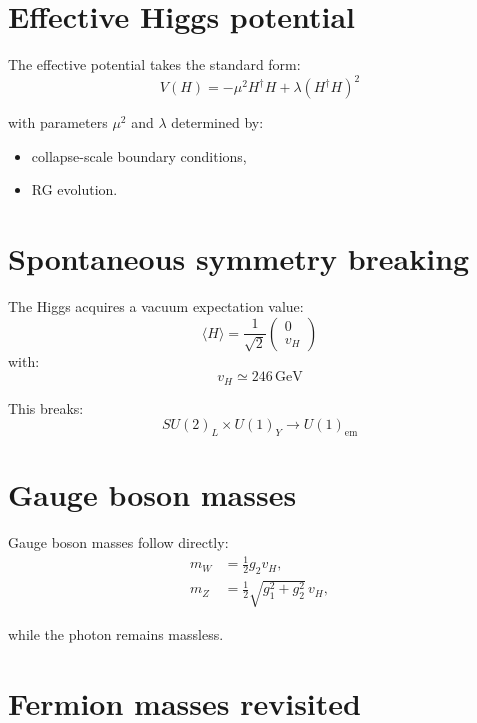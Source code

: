 \documentclass[11pt]{book}
\begin{document}
\section{Effective Higgs potential}

The effective potential takes the standard form:
\begin{equation}
V(H) = -\mu^2 H^\dagger H + \lambda (H^\dagger H)^2
\end{equation}

with parameters $\mu^2$ and $\lambda$ determined by:
\begin{itemize}
\item collapse-scale boundary conditions,
\item RG evolution.
\end{itemize}

\section{Spontaneous symmetry breaking}

The Higgs acquires a vacuum expectation value:
\begin{equation}
\langle H \rangle =
\frac{1}{\sqrt{2}}
\begin{pmatrix}
0 \\ v_H
\end{pmatrix}
\end{equation}
with:
\begin{equation}
v_H \simeq 246\,\mathrm{GeV}
\end{equation}

This breaks:
\begin{equation}
SU(2)_L \times U(1)_Y \to U(1)_{\mathrm{em}}
\end{equation}

\section{Gauge boson masses}

Gauge boson masses follow directly:
\begin{align}
m_W &= \frac{1}{2} g_2 v_H, \\
m_Z &= \frac{1}{2} \sqrt{g_1^2 + g_2^2}\, v_H,
\end{align}

while the photon remains massless.

\section{Fermion masses revisited}
\end{document}
